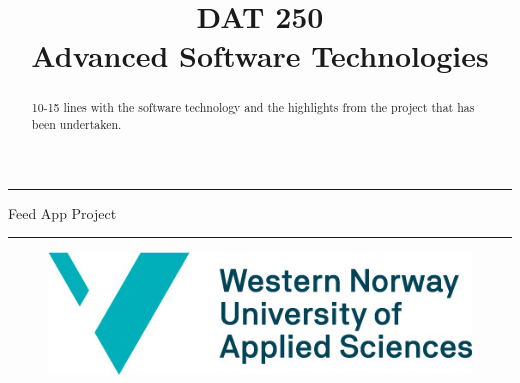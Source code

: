\documentclass[11pt]{article}
\begin{document}

\title{DAT 250\\Advanced Software Technologies}


\maketitle
\noindent\rule{\textwidth}{1.6pt}\vspace*{\baselineskip}\vspace{2pt}
\vspace{0.75\baselineskip}
{\huge \centering
Feed App Project\\}
\vspace{0.75\baselineskip}
\noindent\rule{\textwidth}{1.6pt}\vspace*{-\baselineskip}\vspace{2pt}
\vspace{9pc}
\begin{figure}[H]
  \centering
  \includegraphics[scale=0.5]{figs/HVL_logo.jpg}
  \label{fig:logo}
\end{figure}
\newpage
{}
\tableofcontents
\newpage

\begin{abstract}

  10-15 lines with the software technology and the highlights from the
  project that has been undertaken.

\end{abstract}
\newpage

% 

% 







% 

% 



\end{document}
